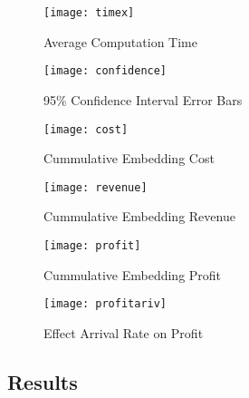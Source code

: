 \documentclass[journal]{IEEEtran}
\begin{document}
\begin{figure*}[th]
\setlength{\abovecaptionskip}{7pt plus 0pt minus 0pt}
\setlength{\belowcaptionskip}{7pt plus 0pt minus 0pt}
\begin{minipage}{.33\textwidth}
\centering
\resizebox{.99\textwidth}{!}
 {\texttt{[image: timex]}}
  \caption{Average Computation Time}
  \label{ComputationTime}
\end{minipage}
\begin{minipage}{.33\textwidth}
\resizebox{.99\textwidth}{!}
{\texttt{[image: confidence]}}
  \caption{95\% Confidence Interval Error Bars}
  \label{confidence}
\end{minipage}
\begin{minipage}{.33\textwidth}
\centering
\resizebox{.99\textwidth}{!}
{\texttt{[image: cost]}}
  \caption{Cummulative Embedding Cost}
  \label{cost}
\end{minipage}
\begin{minipage}{.33\textwidth}
\centering
\resizebox{0.99\textwidth}{!}
{\texttt{[image: revenue]}}
  \caption{Cummulative Embedding Revenue}
  \label{revenue}
\end{minipage}
\begin{minipage}{.33\textwidth}
\centering
\resizebox{0.99\textwidth}{!}
{\texttt{[image: profit]}}
  \caption{Cummulative Embedding Profit}
  \label{profit}
\end{minipage}
\begin{minipage}{.33\textwidth}
\resizebox{.99\textwidth}{!}
{\texttt{[image: profitariv]}}
  \caption{Effect Arrival Rate on Profit}
  \label{profitariv}
\end{minipage}
\end{figure*}

\subsection{Results}
\end{document}
